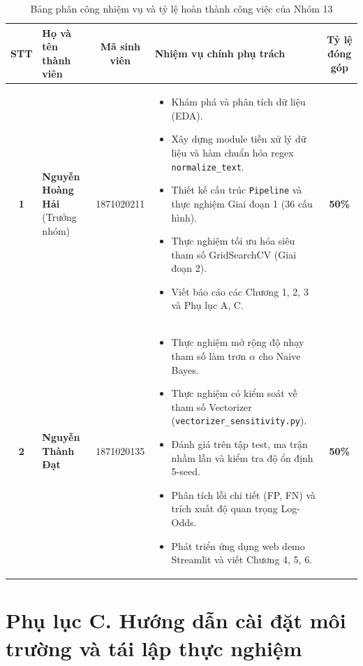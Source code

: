 \begin{table}[H]
\centering
\caption{Bảng phân công nhiệm vụ và tỷ lệ hoàn thành công việc của Nhóm 13}
\label{tab:phan-cong-nhiem-vu}
\begin{tabular}{|c|p{4cm}|c|p{6.5cm}|c|}
\hline
\textbf{STT} & \textbf{Họ và tên thành viên} & \textbf{Mã sinh viên} & \textbf{Nhiệm vụ chính phụ trách} & \textbf{Tỷ lệ đóng góp} \\
\hline
\textbf{1} & \textbf{Nguyễn Hoàng Hải} (Trưởng nhóm) & 1871020211 &
\begin{itemize}[leftmargin=*, nosep]
    \item Khám phá và phân tích dữ liệu (EDA).
    \item Xây dựng module tiền xử lý dữ liệu và hàm chuẩn hóa regex \texttt{normalize\_text}.
    \item Thiết kế cấu trúc \texttt{Pipeline} và thực nghiệm Giai đoạn 1 (36 cấu hình).
    \item Thực nghiệm tối ưu hóa siêu tham số GridSearchCV (Giai đoạn 2).
    \item Viết báo cáo các Chương 1, 2, 3 và Phụ lục A, C.
\end{itemize}
& \textbf{50\%} \\
\hline
\textbf{2} & \textbf{Nguyễn Thành Đạt} & 1871020135 &
\begin{itemize}[leftmargin=*, nosep]
    \item Thực nghiệm mở rộng độ nhạy tham số làm trơn $\alpha$ cho Naive Bayes.
    \item Thực nghiệm có kiểm soát về tham số Vectorizer (\texttt{vectorizer\_sensitivity.py}).
    \item Đánh giá trên tập test, ma trận nhầm lẫn và kiểm tra độ ổn định 5-seed.
    \item Phân tích lỗi chi tiết (FP, FN) và trích xuất độ quan trọng Log-Odds.
    \item Phát triển ứng dụng web demo Streamlit và viết Chương 4, 5, 6.
\end{itemize}
& \textbf{50\%} \\
\hline
\end{tabular}
\end{table}

\clearpage

\section*{Phụ lục C. Hướng dẫn cài đặt môi trường và tái lập thực nghiệm}

